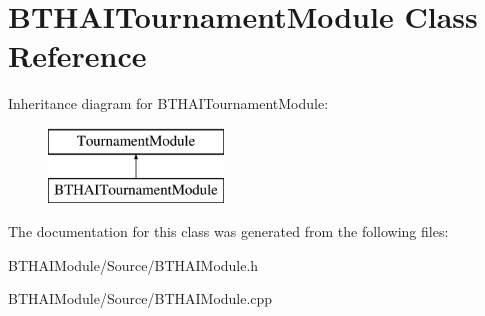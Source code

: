 \hypertarget{class_b_t_h_a_i_tournament_module}{\section{B\-T\-H\-A\-I\-Tournament\-Module Class Reference}
\label{class_b_t_h_a_i_tournament_module}
}
Inheritance diagram for B\-T\-H\-A\-I\-Tournament\-Module\-:\begin{figure}[H]
\begin{center}
\leavevmode
\includegraphics[height=2.000000cm]{class_b_t_h_a_i_tournament_module}
\end{center}
\end{figure}


The documentation for this class was generated from the following files\-:\begin{DoxyCompactItemize}
\item 
B\-T\-H\-A\-I\-Module/\-Source/B\-T\-H\-A\-I\-Module.\-h\item 
B\-T\-H\-A\-I\-Module/\-Source/B\-T\-H\-A\-I\-Module.\-cpp\end{DoxyCompactItemize}
